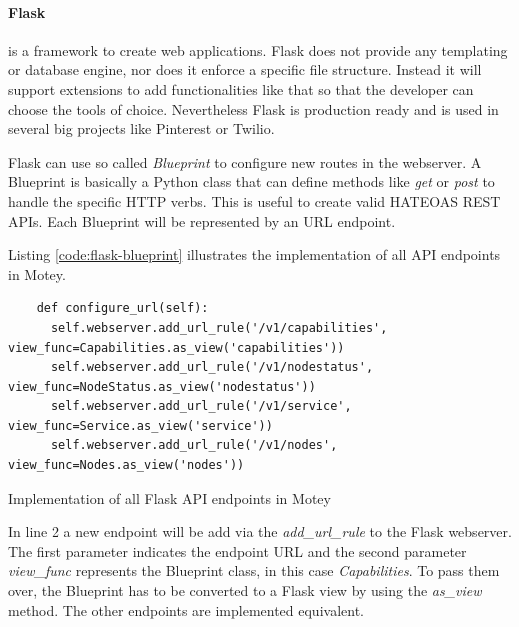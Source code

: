 \paragraph{Flask} is a framework to create web applications.
Flask does not provide any templating or database engine, nor does it enforce a specific file structure.
Instead it will support extensions to add functionalities like that so that the developer can choose the tools of choice.\autocite[cf.]{Flask:Documentation:Foreword}
Nevertheless Flask is production ready and is used in several big projects like Pinterest\autocite{Quora:Pinterest:Flask} or Twilio\autocite{Twilio:Flask}.

Flask can use so called \textit{Blueprint} to configure new routes in the webserver.
A Blueprint is basically a Python class that can define methods like \textit{get} or \textit{post} to handle the specific \ac{HTTP} verbs.
This is useful to create valid \ac{HATEOAS} \ac{REST} \acp{API}.
Each Blueprint will be represented by an \ac{URL} endpoint.

Listing \ref{code:flask-blueprint} illustrates the implementation of all \ac{API} endpoints in Motey.
\begin{listing}[H]
  \begin{verbatim}
    def configure_url(self):
      self.webserver.add_url_rule('/v1/capabilities', view_func=Capabilities.as_view('capabilities'))
      self.webserver.add_url_rule('/v1/nodestatus', view_func=NodeStatus.as_view('nodestatus'))
      self.webserver.add_url_rule('/v1/service', view_func=Service.as_view('service'))
      self.webserver.add_url_rule('/v1/nodes', view_func=Nodes.as_view('nodes'))
  \end{verbatim}
  \caption{Implementation of all Flask \ac{API} endpoints in Motey}
  \label{code:flask-blueprint}
\end{listing}

In line 2 a new endpoint will be add via the \textit{add\_url\_rule} to the Flask webserver.
The first parameter indicates the endpoint \ac{URL} and the second parameter \textit{view\_func} represents the Blueprint class, in this case \textit{Capabilities}.
To pass them over, the Blueprint has to be converted to a Flask view by using the \textit{as\_view} method.
The other endpoints are implemented equivalent.

